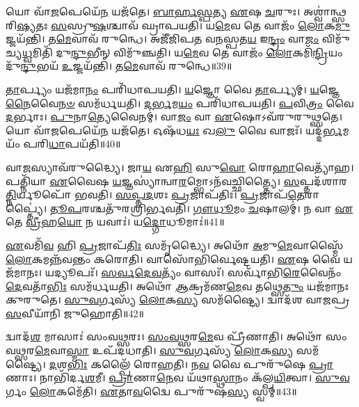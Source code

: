 𑌯𑍋 𑌵𑌾᳴\-\ul{𑌜}\-𑌪𑍇𑌯𑍇᳴\-\ul{𑌨} 𑌯𑌜᳴𑌤𑍇।
\-\ul{𑌬𑌾}\-\-\ul{𑌰𑍍}\-\-\ul{𑌹}\-\-\ul{𑌸𑍍𑌪}\-𑌤𑍍𑌯 \ul{𑌏}\-𑌷 \ul{𑌚}\-𑌰𑍁𑌃।
𑌅𑌶𑍍𑌵𑌾॑𑌨𑍍𑌥𑍍𑌸𑌰𑌿\-\ul{𑌷𑍍𑌯}\-𑌤𑌃 \ul{𑌸}\-𑌸𑍍𑌰𑍁\-\ul{𑌷}\-𑌶𑍍𑌚𑌾𑌵᳴ 𑌘𑍍𑌰𑌾𑌪𑌯𑌤𑌿।
𑌯\-\ul{𑌮𑍇}\-𑌵 𑌤𑍇 𑌵𑌾𑌜𑌂᳴ \ul{𑌲𑍋}\-𑌕\-\ul{𑌮𑍁}\-𑌜𑍍𑌜𑌯᳴𑌨𑍍𑌤𑌿।
𑌤\-\ul{𑌮𑍇}\-𑌵𑌾𑌵᳴ 𑌰𑍁𑌨𑍍𑌧𑍇।
𑌅𑌜𑍀᳴𑌜𑌿𑌪𑌤 𑌵𑌨𑌸𑍍𑌪𑌤\-\ul{𑌯} 𑌇\-\ul{𑌨𑍍𑌦𑍍𑌰𑌂} 𑌵𑌾\-\ul{𑌜𑌂} 𑌵𑌿𑌮𑍁᳴𑌚𑍍𑌯\-\ul{𑌧𑍍𑌵}\-𑌮𑌿𑌤𑌿᳴ 𑌦𑍁\-\ul{𑌨𑍍𑌦𑍁}\-𑌭𑍀𑌨𑍍 𑌵𑌿𑌮𑍁᳴𑌞𑍍𑌚𑌤𑌿।
𑌯\-\ul{𑌮𑍇}\-𑌵 𑌤𑍇 𑌵𑌾𑌜𑌂᳴ \ul{𑌲𑍋}\-𑌕𑌮𑌿᳴\-\ul{𑌨𑍍𑌦𑍍𑌰𑌿}\-𑌯𑌂 𑌦𑍁᳴\-\ul{𑌨𑍍𑌦𑍁}\-𑌭𑌯᳴ \ul{𑌉}\-𑌜𑍍𑌜𑌯᳴𑌨𑍍𑌤𑌿।
𑌤\-\ul{𑌮𑍇}\-𑌵𑌾𑌵᳴ 𑌰𑍁𑌨𑍍𑌧𑍇॥39॥

\-\ul{𑌤𑌾}\-𑌰𑍍𑌪𑍍𑌯𑌂 𑌯𑌜᳴𑌮𑌾\-\ul{𑌨𑌂} 𑌪𑌰𑌿᳴𑌧𑌾𑌪𑌯𑌤𑌿।
\-\ul{𑌯}\-𑌜𑍍𑌞𑍋 𑌵𑍈 \ul{𑌤𑌾}\-𑌰𑍍𑌪𑍍𑌯𑌮𑍍।
\-\ul{𑌯}\-𑌜𑍍𑌞𑍇\-\ul{𑌨𑍈}\-𑌵𑍈\-\ul{𑌨}\-\-\ul{𑍞} 𑌸𑌮᳴𑌰𑍍𑌧𑌯𑌤𑌿।
\-\ul{𑌦}\-\-\ul{𑌰𑍍𑌭}\-𑌮\-\ul{𑌯𑌂} 𑌪𑌰𑌿᳴𑌧𑌾𑌪𑌯𑌤𑌿।
\-\ul{𑌪}\-𑌵𑌿\-\ul{𑌤𑍍𑌰𑌂} 𑌵𑍈 \ul{𑌦}\-𑌰𑍍𑌭𑌾𑌃।
\-\ul{𑌪𑍁}\-𑌨𑌾\-\ul{𑌤𑍍𑌯𑍇}\-𑌵𑍈𑌨𑌮𑍍॑।
𑌵𑌾\-\ul{𑌜𑌂} 𑌵𑌾 \ul{𑌏}\-𑌷𑍋\-𑌽𑌵᳴𑌰𑍁𑌰𑍁𑌥𑍍𑌸𑌤𑍇।
𑌯𑍋 𑌵𑌾᳴\-\ul{𑌜}\-𑌪𑍇𑌯𑍇᳴\-\ul{𑌨} 𑌯𑌜᳴𑌤𑍇।
𑌓𑌷᳴𑌧\-\ul{𑌯𑌃} 𑌖\-\ul{𑌲𑍁} 𑌵𑍈 𑌵𑌾𑌜𑌃᳴।
𑌯𑌦𑍍𑌦᳴\-\ul{𑌰𑍍𑌭}\-𑌮𑌯𑌂᳴ 𑌪𑌰𑌿\-\ul{𑌧𑌾}\-𑌪𑌯᳴𑌤𑌿॥40॥

𑌵𑌾\-\ul{𑌜}\-𑌸𑍍𑌯𑌾𑌵᳴𑌰𑍁𑌦𑍍𑌧𑍍𑌯𑍈।
𑌜𑌾\-\ul{𑌯} 𑌏\-\ul{𑌹𑌿} 𑌸𑍁\-\ul{𑌵𑍋} 𑌰𑍋\-\ul{𑌹𑌾}\-𑌵𑍇𑌤𑍍𑌯𑌾᳴𑌹।
𑌪𑌤𑍍𑌨𑌿᳴𑌯𑌾 \ul{𑌏}\-𑌵𑍈𑌷 \ul{𑌯}\-𑌜𑍍𑌞𑌸𑍍𑌯𑌾॑𑌨𑍍𑌵𑌾\-\ul{𑌰}\-𑌮𑍍𑌭𑍋\-𑌽𑌨᳴𑌵𑌚𑍍𑌛𑌿𑌤𑍍𑌤𑍍𑌯𑍈।
\-\ul{𑌸}\-𑌪𑍍𑌤𑌦᳴𑌶𑌾𑌰\-\ul{𑌤𑍍𑌨𑌿}\-𑌰𑍍𑌯𑍂𑌪𑍋᳴ 𑌭𑌵𑌤𑌿।
\-\ul{𑌸}\-\-\ul{𑌪𑍍𑌤}\-\-\ul{𑌦}\-𑌶𑌃 \ul{𑌪𑍍𑌰}\-𑌜𑌾\-𑌪᳴𑌤𑌿𑌃।
\-\ul{𑌪𑍍𑌰}\-𑌜𑌾𑌪᳴\-\ul{𑌤𑍇}\-𑌰𑌾𑌪𑍍𑌤𑍍𑌯𑍈॑।
\-\ul{𑌤𑍂}\-\-\ul{𑌪}\-𑌰𑌶𑍍𑌚𑌤𑍁᳴𑌰𑌶𑍍𑌰𑌿𑌰𑍍𑌭𑌵𑌤𑌿।
\-\ul{𑌗𑍗}\-\-\ul{𑌧𑍂}\-𑌮𑌂 \ul{𑌚}\-𑌷𑌾𑌲𑌮𑍍॑।
𑌨 𑌵𑌾 \ul{𑌏}\-𑌤𑍇 \ul{𑌵𑍍𑌰𑍀}\-𑌹\-\ul{𑌯𑍋} 𑌨 𑌯𑌵𑌾𑌃॑।
𑌯\-\ul{𑌦𑍍𑌗𑍋}\-𑌧𑍂𑌮𑌾𑌃॑॥41॥

\-\ul{𑌏}\-𑌵𑌮𑌿᳴\-\ul{𑌵} 𑌹𑌿 \ul{𑌪𑍍𑌰}\-𑌜𑌾\-𑌪᳴\-\ul{𑌤𑌿𑌃} 𑌸𑌮𑍃᳴𑌦𑍍𑌧𑍍𑌯𑍈।
𑌅𑌥𑍋᳴ \ul{𑌅}\-𑌮𑍁\-\ul{𑌮𑍇}\-𑌵𑌾𑌸𑍍𑌮𑍈᳴ \ul{𑌲𑍋}\-𑌕𑌮𑌨𑍍𑌨᳴𑌵𑌨𑍍𑌤𑌂 𑌕𑌰𑍋𑌤𑌿।
𑌵𑌾𑌸𑍋᳴𑌭𑌿𑌰𑍍𑌵𑍇𑌷𑍍𑌟𑌯𑌤𑌿।
\-\ul{𑌏}\-𑌷 𑌵𑍈 𑌯𑌜᳴𑌮𑌾𑌨𑌃।
𑌯𑌦𑍍𑌯𑍂𑌪𑌃᳴।
\-\ul{𑌸}\-\-\ul{𑌰𑍍𑌵}\-\-\ul{𑌦𑍇}\-\-\ul{𑌵}\-𑌤𑍍𑌯𑌂᳴ 𑌵𑌾𑌸𑌃᳴।
𑌸𑌰𑍍𑌵𑌾᳴𑌭𑌿\-\ul{𑌰𑍇}\-𑌵𑍈𑌨𑌂᳴ \ul{𑌦𑍇}\-𑌵𑌤𑌾᳴\-\ul{𑌭𑌿𑌃} 𑌸𑌮᳴𑌰𑍍𑌧𑌯𑌤𑌿।
𑌅𑌥𑍋᳴ \ul{𑌆}\-𑌕𑍍𑌰𑌮᳴𑌣\-\ul{𑌮𑍇}\-𑌵 𑌤𑌥𑍍𑌸𑍇\-\ul{𑌤𑍁𑌂} 𑌯𑌜᳴𑌮𑌾𑌨𑌃 𑌕𑍁𑌰𑍁𑌤𑍇।
\-\ul{𑌸𑍁}\-\-\ul{𑌵}\-𑌰𑍍𑌗𑌸𑍍𑌯᳴ \ul{𑌲𑍋}\-𑌕\-\ul{𑌸𑍍𑌯} 𑌸𑌮᳴𑌷𑍍𑌟𑍍𑌯𑍈।
𑌦𑍍𑌵𑌾𑌦᳴𑌶 𑌵𑌾𑌜𑌪𑍍𑌰\-\ul{𑌸}\-𑌵𑍀𑌯𑌾᳴𑌨𑌿 𑌜𑍁𑌹𑍋𑌤𑌿॥42॥

𑌦𑍍𑌵𑌾𑌦᳴\-\ul{𑌶} 𑌮𑌾𑌸𑌾𑌃॑ 𑌸𑌂𑌵\-\ul{𑌥𑍍𑌸}\-𑌰𑌃।
\-\ul{𑌸𑌂}\-\-\ul{𑌵}\-\-\ul{𑌥𑍍𑌸}\-𑌰\-\ul{𑌮𑍇}\-𑌵 𑌪𑍍𑌰𑍀᳴𑌣𑌾𑌤𑌿।
𑌅𑌥𑍋᳴ 𑌸𑌂𑌵\-\ul{𑌥𑍍𑌸}\-𑌰\-\ul{𑌮𑍇}\-𑌵𑌾\-\ul{𑌸𑍍𑌮𑌾} 𑌉𑌪᳴𑌦𑌧𑌾𑌤𑌿।
\-\ul{𑌸𑍁}\-\-\ul{𑌵}\-𑌰𑍍𑌗𑌸𑍍𑌯᳴ \ul{𑌲𑍋}\-𑌕\-\ul{𑌸𑍍𑌯} 𑌸𑌮᳴𑌷𑍍𑌟𑍍𑌯𑍈।
\-\ul{𑌦}\-𑌶\-\ul{𑌭𑌿𑌃} 𑌕𑌲𑍍𑌪𑍈᳴ 𑌰𑍋𑌹𑌤𑌿।
𑌨\-\ul{𑌵} 𑌵𑍈 𑌪𑍁𑌰𑍁᳴𑌷𑍇 \ul{𑌪𑍍𑌰𑌾}\-𑌣𑌾𑌃।
𑌨𑌾𑌭𑌿᳴𑌰𑍍𑌦\-\ul{𑌶}\-𑌮𑍀।
\-\ul{𑌪𑍍𑌰𑌾}\-𑌣𑌾\-\ul{𑌨𑍇}\-𑌵 𑌯᳴𑌥𑌾\-\ul{𑌸𑍍𑌥𑌾}\-𑌨𑌂 𑌕᳴𑌲𑍍𑌪\-\ul{𑌯𑌿}\-𑌤𑍍𑌵𑌾।
\-\ul{𑌸𑍁}\-\-\ul{𑌵}\-𑌰𑍍𑌗𑌂 \ul{𑌲𑍋}\-𑌕𑌮𑍇᳴𑌤𑌿।
\-\ul{𑌏}\-𑌤𑌾\-\ul{𑌵}\-𑌦𑍍𑌵𑍈 𑌪𑍁𑌰𑍁᳴𑌷\-\ul{𑌸𑍍𑌯} 𑌸𑍍𑌵𑌮𑍍॥43॥

